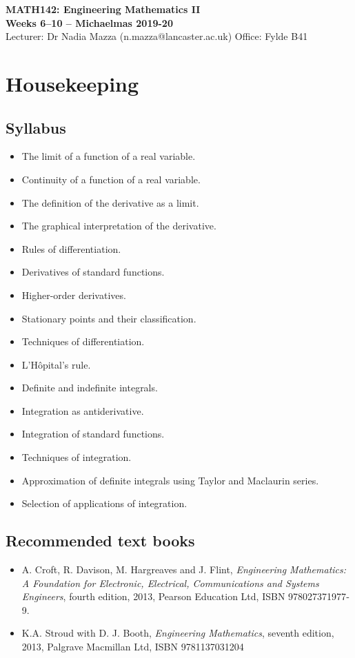 \documentclass[12pt]{article}
\theoremstyle{definition}
\newcounter{ex}\renewcommand\theex{\arabic{ex}}
\begin{document}
\begin{center}
{\Large{\bf MATH142: Engineering Mathematics II}}\\
{\large{\bf Weeks 6--10 -- Michaelmas 2019-20}}\\
Lecturer: Dr Nadia Mazza
(\textsf{n.mazza@lancaster.ac.uk}) \quad 
Office: Fylde B41
\end{center}

\tableofcontents
\vfill

\newpage
\section{Housekeeping}\label{sec:housekeeping}

\subsection{Syllabus}

\begin{itemize}\item
  The limit of a function of a real variable.
\item Continuity of a function of a real variable.
\item The definition of the derivative as a limit.
\item The graphical interpretation of the derivative.
\item Rules of differentiation.
\item Derivatives of standard functions.
\item Higher-order derivatives.
\item Stationary points and their classification.
\item Techniques of differentiation.
\item L'H\^opital's rule.
\item Definite and indefinite integrals.
\item Integration as antiderivative.
\item Integration of standard functions.
\item Techniques of integration.
\item Approximation of definite integrals using Taylor and Maclaurin series.
\item Selection of applications of integration.
\end{itemize}

\subsection{Recommended text books}
\begin{itemize}
\item A. Croft, R. Davison, M. Hargreaves and J. Flint, {\em
  Engineering Mathematics: A Foundation for Electronic, Electrical,
  Communications and Systems Engineers}, fourth edition, 2013, Pearson
  Education Ltd, ISBN 978­0­273­71977­9.
\item
K.A. Stroud with D. J. Booth, {\em Engineering Mathematics}, seventh
edition, 2013, Palgrave Macmillan Ltd, ISBN 978­1­137­03120­4
\end{itemize}
\end{document}
